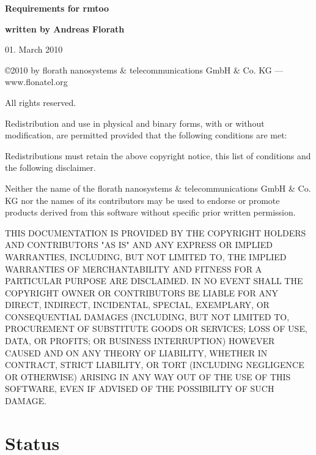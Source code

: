 \documentclass{article}
\begin{document}
\thispagestyle{empty}

\mbox{}

\vfill

{\LARGE\textbf{Requirements for rmtoo}}

\vfill

{\Large\textbf{written by Andreas Florath}}

\vfill

01. March 2010

\vfill

\newpage

\mbox{}

\vfill

{\small

\copyright 2010 by florath nanosystems \& telecommunications GmbH \& Co. KG
--- www.flonatel.org 

All rights reserved.

Redistribution and use in physical and binary forms, with or without
modification, are permitted provided that the following conditions are
met:

Redistributions must retain the above copyright notice, this list of
conditions and the following disclaimer.

Neither the name of the florath nanosystems \& telecommunications GmbH
\& Co. KG nor the names of its contributors may be used to endorse or
promote products derived from this software without specific prior
written permission.

THIS DOCUMENTATION IS PROVIDED BY THE COPYRIGHT HOLDERS AND
CONTRIBUTORS "AS IS" AND ANY EXPRESS OR IMPLIED WARRANTIES, INCLUDING,
BUT NOT LIMITED TO, THE IMPLIED WARRANTIES OF MERCHANTABILITY AND
FITNESS FOR A PARTICULAR PURPOSE ARE DISCLAIMED. IN NO EVENT SHALL THE
COPYRIGHT OWNER OR CONTRIBUTORS BE LIABLE FOR ANY DIRECT, INDIRECT,
INCIDENTAL, SPECIAL, EXEMPLARY, OR CONSEQUENTIAL DAMAGES (INCLUDING,
BUT NOT LIMITED TO, PROCUREMENT OF SUBSTITUTE GOODS OR SERVICES; LOSS
OF USE, DATA, OR PROFITS; OR BUSINESS INTERRUPTION) HOWEVER CAUSED AND
ON ANY THEORY OF LIABILITY, WHETHER IN CONTRACT, STRICT LIABILITY, OR
TORT (INCLUDING NEGLIGENCE OR OTHERWISE) ARISING IN ANY WAY OUT OF THE
USE OF THIS SOFTWARE, EVEN IF ADVISED OF THE POSSIBILITY OF SUCH
DAMAGE.
}
\newpage

\tableofcontents

\newpage

\section{Status}

\end{document}
